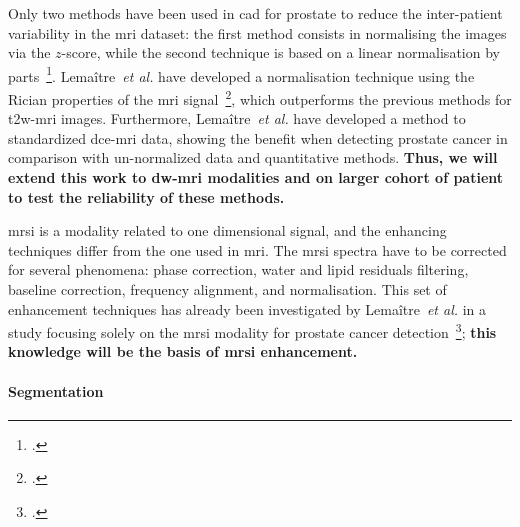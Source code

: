 Only two methods have been used in \ac{cad} for prostate to reduce the inter-patient variability in the \ac{mri} dataset: the first method consists in normalising the images via the $z$-score, while the second technique is based on a linear normalisation by parts~\footcite{Madabhushi2006a}.
Lema\^itre~\emph{et al.} have developed a normalisation technique using the Rician properties of the \ac{mri} signal~\footcite{lemaitre2016normalization}, which outperforms the previous methods for \ac{t2w}-\ac{mri} images.
Furthermore, Lema\^itre~\emph{et al.} have developed a method to standardized \ac{dce}-\ac{mri} data, showing the benefit when detecting prostate cancer in comparison with un-normalized data and quantitative methods.
\textbf{Thus, we will extend this work to \ac{dw}-\ac{mri} modalities and on larger cohort of patient to test the reliability of these methods.}

\ac{mrsi} is a modality related to one dimensional signal, and the enhancing techniques differ from the one used in \ac{mri}.
The \ac{mrsi} spectra have to be corrected for several phenomena: phase correction, water and lipid residuals filtering, baseline correction, frequency alignment, and normalisation.
This set of enhancement techniques has already been investigated by Lema\^itre~\emph{et al.} in a study focusing solely on the \ac{mrsi} modality for prostate cancer detection~\footcite{Lemaitre2011}; \textbf{this knowledge will be the basis of \ac{mrsi} enhancement.}

\paragraph{Segmentation}

